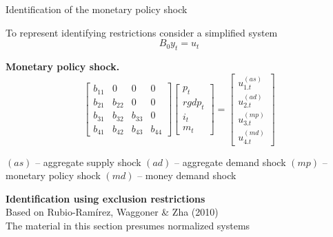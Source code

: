 \documentclass[notes,blackandwhite,mathsans,usenames,dvipsnames]{beamer}
\begin{document}
\begin{frame}{Identification of the monetary policy shock}

{\color{mcxs2}To represent identifying restrictions consider a simplified system} 
$$B_0y_t=u_t$$

\textbf{Monetary policy shock.}
$$
\begin{bmatrix} b_{11} & 0 &0&0 \\ b_{21} & b_{22} &0&0 \\ b_{31}& b_{32}&b_{33}&0 \\ b_{41}& b_{42}&b_{43}&b_{44} \end{bmatrix}\begin{bmatrix}  p_t \\ rgdp_t \\ i_t \\ m_t \end{bmatrix} = \begin{bmatrix} u_{1.t}^{(as)} \\ u_{2.t}^{(ad)} \\u_{3.t}^{(mp)}  \\ u_{4.t}^{(md)}\end{bmatrix}
$$

$(as)$ {\color{mcxs2}-- aggregate supply shock}
$(ad)$ {\color{mcxs2}-- aggregate demand shock}
$(mp)$ {\color{mcxs2}-- monetary policy shock}
$(md)$ {\color{mcxs2}-- money demand shock}


\end{frame}





{
\begin{frame}

\begin{adjustwidth}{-0.5cm}{0cm}
\Large
\textbf{{\color{mcxs5}Identification using} {\color{mcxs1}exclusion restrictions}}\\[30ex]
\small{\color{mcxs5}Based on Rubio-Ram\'irez, Waggoner \& Zha (2010)\\
The material in this section presumes normalized systems}
\end{adjustwidth}

\end{frame}
}
 
\end{document}
